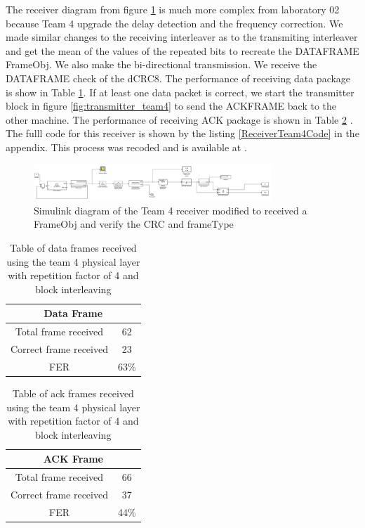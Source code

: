 The receiver diagram from figure \ref{fig:receiver_team4} is much more complex from laboratory 02 because Team 4 upgrade the delay detection and the frequency correction.
We made similar changes to the receiving interleaver as to the transmiting interleaver and get the mean of the values of the repeated bits to recreate the DATAFRAME FrameObj.
We also make the bi-directional transmission. We receive the DATAFRAME check of the dCRC8. The performance of receiving data package is show in Table \ref{tab:team4data}. If at least one data packet is correct, we start the transmitter block in figure \ref{fig:transmitter_team4} to send the ACKFRAME back to the other machine. The performance of receiving ACK package is shown in Table \ref{tab:team4ack} . The fulll code for this receiver is shown by the listing \ref{ReceiverTeam4Code} in the appendix. This process was recoded and is available at \cite{videodemo}. 
 

\begin{figure}[ht]
    \centering
    \includegraphics[width=0.8\textwidth]{receiver_team4.PNG}
    \caption{Simulink diagram of the Team 4 receiver modified to received a FrameObj and verify the CRC and frameType }
    \label{fig:receiver_team4}
\end{figure}

\begin{table}[ht]
	\centering
		\begin{tabular}{| c | c | }
		\hline
			\multicolumn{2}{|c|}{Data Frame}\\
		\hline                       
			 Total frame received & 62\\
			 Correct frame received& 23\\
		\hline
			FER & 63\%\\
		\hline
		\end{tabular}
	\caption{Table of data frames received using the team 4 physical layer with repetition factor of 4 and block interleaving}
	\label{tab:team4data}
	\end{table}

\begin{table}[ht]
	\centering
		\begin{tabular}{| c | c | }
		\hline
			\multicolumn{2}{|c|}{ACK Frame}\\ 
		\hline                       
			 Total frame received & 66\\
			 Correct frame received& 37\\
		\hline
			FER & 44\%\\
		\hline
		\end{tabular}
	\caption{Table of ack frames received using the team 4 physical layer with repetition factor of 4 and block interleaving}
	\label{tab:team4ack}
	\end{table}
